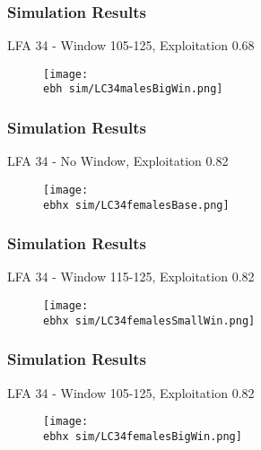 \documentclass{beamer}
\newcommand{\ebh}{\string~/bio.data/bio.lobster/figures/LFA3438Framework2019/} %
\newcommand{\ebhx}{\string~/bio.data/bio.lobster/figures/LFA3438Framework2019/figures/Brad/} %
\begin{document}
\begin{frame}
\frametitle{Simulation Results}
LFA 34 - Window 105-125, Exploitation 0.68
\begin{figure}
        \begin{center}
            \texttt{[image: \\ebh sim/LC34malesBigWin.png]}
        \end{center}
    \end{figure}
\end{frame}





\begin{frame}
\frametitle{Simulation Results}
LFA 34 - No Window, Exploitation 0.82
\begin{figure}
        \begin{center}
            \texttt{[image: \\ebhx sim/LC34femalesBase.png]}
        \end{center}
    \end{figure}
\end{frame}



\begin{frame}
\frametitle{Simulation Results}
LFA 34 - Window 115-125, Exploitation 0.82
\begin{figure}
        \begin{center}
            \texttt{[image: \\ebhx sim/LC34femalesSmallWin.png]}
        \end{center}
    \end{figure}
\end{frame}


\begin{frame}
\frametitle{Simulation Results}
LFA 34 - Window 105-125, Exploitation 0.82
\begin{figure}
        \begin{center}
            \texttt{[image: \\ebhx sim/LC34femalesBigWin.png]}
        \end{center}
    \end{figure}
\end{frame}
\end{document}
